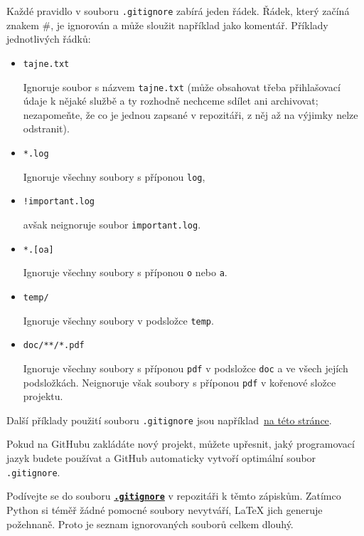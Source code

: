 \documentclass[a4paper,11pt,twoside]{article}
\def\code#1{\textnormal{\texttt{#1}}}
\def\ghfile#1#2{\textnormal{\textbf{\texttt{\href{https://github.com/PavelStransky/PCInPhysics/blob/main/#1#2}{#2}}}}}
\theoremstyle{red}
\theoremstyle{green}
\begin{document}
    Každé pravidlo v souboru \code{.gitignore} zabírá jeden řádek.
    Řádek, který začíná znakem \#, je ignorován a může sloužit například jako komentář.
    Příklady jednotlivých řádků:
    \begin{itemize}
    \item \code{tajne.txt}
        
        Ignoruje soubor s názvem \code{tajne.txt} (může obsahovat třeba přihlašovací údaje k nějaké službě a ty rozhodně nechceme sdílet ani archivovat; nezapomeňte, že co je jednou zapsané v repozitáři, z něj až na výjimky nelze odstranit).

    \item \code{*.log}
    
        Ignoruje všechny soubory s příponou \code{log},

    \item \code{!important.log}

        avšak neignoruje soubor \code{important.log}.

    \item \code{*.[oa]}

        Ignoruje všechny soubory s příponou \code{o} nebo \code{a}.

    \item \code{temp/}

        Ignoruje všechny soubory v podsložce \code{temp}.

    \item \code{doc/**/*.pdf}
    
        Ignoruje všechny soubory s příponou \code{pdf} v podsložce \code{doc} a ve všech jejích podsložkách.
        Neignoruje však soubory s příponou \code{pdf} v kořenové složce projektu.
    \end{itemize}
    Další příklady použití souboru \code{.gitignore} jsou například~\href{https://www.atlassian.com/git/tutorials/saving-changes/gitignore}{na této stránce}.

    Pokud na GitHubu zakládáte nový projekt, můžete upřesnit, jaký programovací jazyk budete používat a GitHub automaticky vytvoří optimální soubor \code{.gitignore}.

    \begin{task}
        Podívejte se do souboru \ghfile{}{.gitignore} v repozitáři k těmto zápiskům.
        Zatímco Python si téměř žádné pomocné soubory nevytváří, {\LaTeX} jich generuje požehnaně.
        Proto je seznam ignorovaných souborů celkem dlouhý. 
    \end{task}
\end{document}
